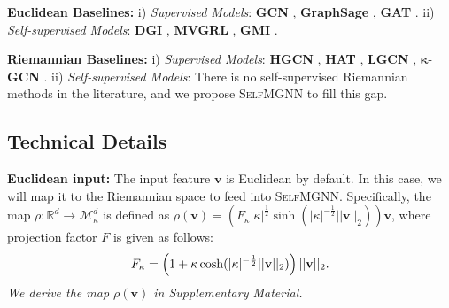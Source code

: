 \noindent\textbf{Euclidean Baselines:} %
i) \emph{Supervised Models}: 
\textbf{GCN} \cite{kipf2016semi},
\textbf{GraphSage} \cite{hamilton2017inductive},
\textbf{GAT} \cite{velickovic2018graph}.
ii) \emph{Self-supervised Models}: 
\textbf{DGI} \cite{VelickovicFHLBH19},
\textbf{MVGRL} \cite{HassaniA20},
\textbf{GMI} \cite{PengHLZRXH20}.

\noindent\textbf{Riemannian Baselines:}
i) \emph{Supervised Models}: 
\textbf{HGCN} \cite{HGCN}, 
\textbf{HAT} \cite{HAN}, 
\textbf{LGCN} \cite{ZhangWSLS21},
$\boldsymbol \kappa$-\textbf{GCN} \cite{BachmannBG20}.
ii)  
\emph{Self-supervised Models}: There is no self-supervised Riemannian methods in the literature, and we propose \textsc{SelfMGNN} to fill this gap.

\vspace{-0.05in}
\subsection{Technical Details}
\noindent\textbf{Euclidean input:} The input feature $\mathbf v$ is Euclidean by default. 
In this case, we will map it to the Riemannian space to feed into \textsc{SelfMGNN}. 
Specifically, the map $\rho: \mathbb R^d \to \mathcal M^d_\kappa$ is defined as 
$\rho(\mathbf v)=( F_\kappa
|\kappa|^{\frac{1}{2}}
\sinh(
|\kappa|^{-\frac{1}{2}}
||\mathbf v||_2
)
)\mathbf v$,
where projection factor $F$ is given as follows:
   \vspace{-0.05in}
\begin{equation}
F_\kappa=\left(1+\kappa\cosh(|\kappa|^{-\frac{1}{2}}||\mathbf v||_2)\right)||\mathbf v||_2.
   \vspace{-0.05in}
\end{equation}
\emph{We derive the map  $\rho(\mathbf v)$ in Supplementary Material.}

